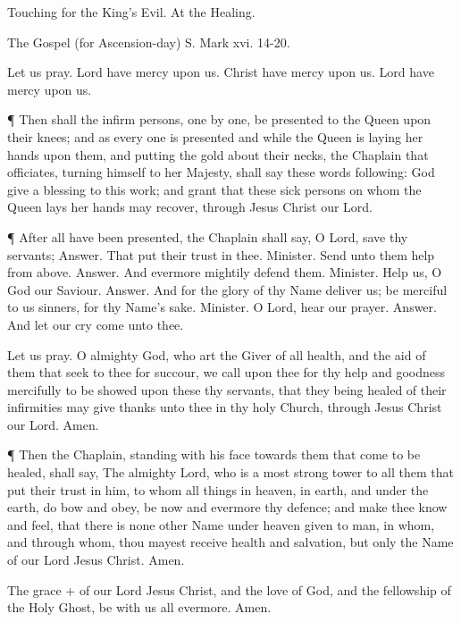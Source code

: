 Touching for the King's Evil.
At the Healing.

The Gospel (for Ascension-day)   S. Mark xvi. 14-20.

Let us pray.
Lord have mercy upon us.
    Christ have mercy upon us.
Lord have mercy upon us.


¶ Then shall the infirm persons, one by one, be presented to the Queen upon their knees; and as every one is presented and while the Queen is laying her hands upon them, and putting the gold about their necks, the Chaplain that officiates, turning himself to her Majesty, shall say these words following:
God give a blessing to this work; and grant that these sick persons on whom the Queen lays her hands may recover, through Jesus Christ our Lord.

¶ After all have been presented, the Chaplain shall say,
O Lord, save thy servants;
Answer. That put their trust in thee.
Minister. Send unto them help from above.
Answer. And evermore mightily defend them.
Minister. Help us, O God our Saviour.
Answer. And for the glory of thy Name deliver us; be merciful to us sinners, for thy Name's sake.
Minister. O Lord, hear our prayer.
Answer. And let our cry come unto thee.

Let us pray.
O almighty God, who art the Giver of all health, and the aid of them that seek to thee for succour, we call upon thee for thy help and goodness mercifully to be showed upon these thy servants, that they being healed of their infirmities may give thanks unto thee in thy holy Church, through Jesus Christ our Lord. Amen.

¶ Then the Chaplain, standing with his face towards them that come to be healed, shall say,
The almighty Lord, who is a most strong tower to all them that put their trust in him, to whom all things in heaven, in earth, and under the earth, do bow and obey, be now and evermore thy defence; and make thee know and feel, that there is none other Name under heaven given to man, in whom, and through whom, thou mayest receive health and salvation, but only the Name of our Lord Jesus Christ. Amen.

The grace + of our Lord Jesus Christ, and the love of God, and the fellowship of the Holy Ghost, be with us all evermore. Amen.

